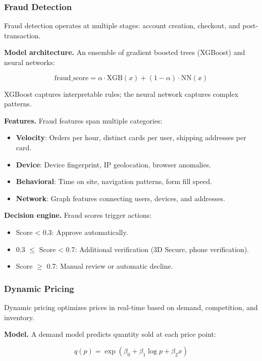 \documentclass[11pt,twocolumn]{article}
\begin{document}
\subsubsection{Fraud Detection}

Fraud detection operates at multiple stages: account creation, checkout, and post-transaction.

\textbf{Model architecture.} An ensemble of gradient boosted trees (XGBoost) and neural networks:

\begin{equation}
\text{fraud\_score} = \alpha \cdot \text{XGB}(x) + (1-\alpha) \cdot \text{NN}(x)
\end{equation}

XGBoost captures interpretable rules; the neural network captures complex patterns.

\textbf{Features.} Fraud features span multiple categories:
\begin{itemize}
\item \textbf{Velocity}: Orders per hour, distinct cards per user, shipping addresses per card.
\item \textbf{Device}: Device fingerprint, IP geolocation, browser anomalies.
\item \textbf{Behavioral}: Time on site, navigation patterns, form fill speed.
\item \textbf{Network}: Graph features connecting users, devices, and addresses.
\end{itemize}

\textbf{Decision engine.} Fraud scores trigger actions:
\begin{itemize}
\item Score < 0.3: Approve automatically.
\item 0.3 $\leq$ Score < 0.7: Additional verification (3D Secure, phone verification).
\item Score $\geq$ 0.7: Manual review or automatic decline.
\end{itemize}

\subsubsection{Dynamic Pricing}

Dynamic pricing optimizes prices in real-time based on demand, competition, and inventory.

\textbf{Model.} A demand model predicts quantity sold at each price point:

\begin{equation}
q(p) = \exp(\beta_0 + \beta_1 \log p + \beta_2 x)
\end{equation}
\end{document}
